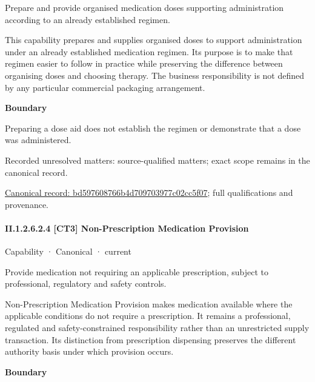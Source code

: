 Prepare and provide organised medication doses supporting administration according to an already established regimen.



This capability prepares and supplies organised doses to support administration under an already established medication regimen. Its purpose is to make that regimen easier to follow in practice while preserving the difference between organising doses and choosing therapy. The business responsibility is not defined by any particular commercial packaging arrangement.



\textbf{Boundary}



Preparing a dose aid does not establish the regimen or demonstrate that a dose was administered.


{\small Recorded unresolved matters: source-qualified matters; exact scope remains in the canonical record.}\par
{\footnotesize \href{../../../../../../../continuum/strategy/capability/bd597608766b4d709703977c02cc5f07.md}{Canonical record: bd597608766b4d709703977c02cc5f07}; full qualifications and provenance.}\par
\paragraph*{II.1.2.6.2.4 [CT3] Non-Prescription Medication Provision}
\label{navigation:II.1.2.6.2.4}

\label{element:7bbe4810fb974a8ab6d47b30d6475df3}
{\small Capability · Canonical · current}\par

Provide medication not requiring an applicable prescription, subject to professional, regulatory and safety controls.



Non-Prescription Medication Provision makes medication available where the applicable conditions do not require a prescription. It remains a professional, regulated and safety-constrained responsibility rather than an unrestricted supply transaction. Its distinction from prescription dispensing preserves the different authority basis under which provision occurs.



\textbf{Boundary}



